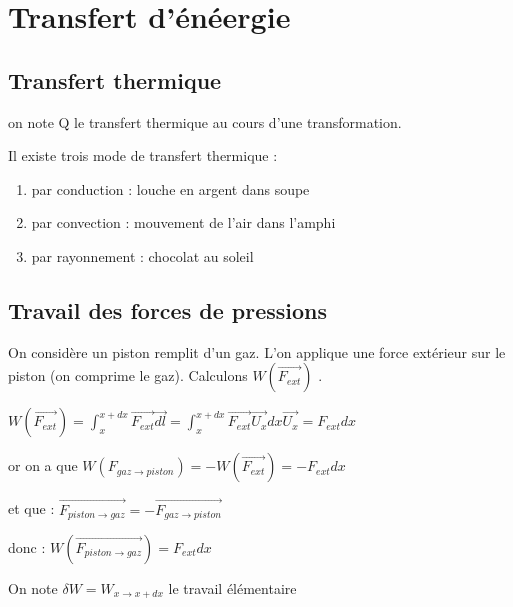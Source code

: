 \documentclass[a4paper,10pt]{report}
\begin{document}
\section{Transfert d'énéergie}
\subsection{Transfert thermique}
on note Q le transfert thermique au cours d'une transformation.

Il existe trois mode de transfert thermique :
\begin{enumerate}
 \item par conduction : louche en argent dans soupe
 \item par convection : mouvement de l'air dans l'amphi
 \item par rayonnement : chocolat au soleil
\end{enumerate}

\subsection{Travail des forces de pressions}
On considère un piston remplit d'un gaz. L'on applique une force extérieur sur le piston (on comprime le gaz).
Calculons \begin{math}
           W(\overrightarrow{F_{ext}})
          \end{math}
.

\begin{math}
 W(\overrightarrow{F_{ext}})= \int_x^{x+dx}\overrightarrow{F_{ext}} \overrightarrow{dl} = \int_x^{x+dx}\overrightarrow{F_{ext}} \overrightarrow{U_x} dx \overrightarrow{U_x} 
 =F_{ext} dx
\end{math}

or on a que 
\begin{math}
 W(F_{gaz\rightarrow piston})=- W(\overrightarrow{F_{ext}}) = -F_{ext} dx
\end{math}

et que : 
\begin{math}
 \overrightarrow{F_{piston\rightarrow gaz}}=-\overrightarrow{F_{gaz\rightarrow piston}} 
\end{math}

donc :
\begin{math}
 W(\overrightarrow{F_{piston\rightarrow gaz}}) = F_{ext} dx
\end{math}

On note \begin{math}
         \delta W = W_{x\rightarrow x+dx}
        \end{math} le travail élémentaire
\end{document}
